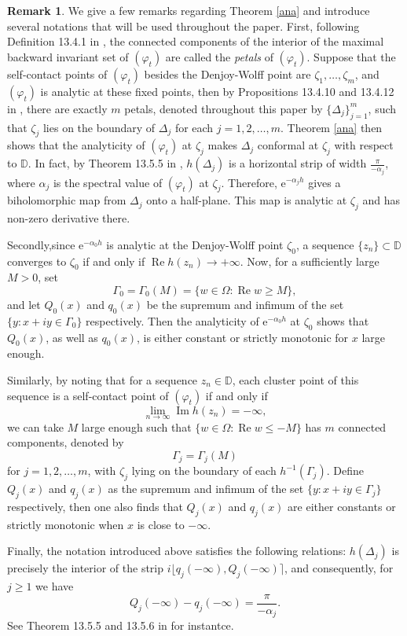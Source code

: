 \documentclass{amsart}
\theoremstyle{proclaim}
\theoremstyle{fancyproclaim}
\theoremstyle{definition}
\newtheorem{remark}[theorem]{Remark}
\theoremstyle{fancystatement}
\numberwithin{equation}{section}
\begin{document}
\begin{remark}\label{remarkchang}
We give a few remarks regarding Theorem \ref{ana} and introduce several notations that will be used throughout the paper. First, following Definition 13.4.1 in \cite{cs}, the connected components of the interior of the maximal backward invariant set of $(\varphi_t)$ are called the  \emph{petals} of $(\varphi_t)$. Suppose that the self-contact points of $(\varphi_t)$ besides the Denjoy-Wolff point are $\zeta_1,\dots,\zeta_m$, and $(\varphi_t)$ is analytic at these fixed points, then by Propositions 13.4.10 and 13.4.12 in \cite{cs}, there are exactly $m$ petals, denoted throughout this paper by $\{\Delta_j\}_{j=1}^m$, such that $\zeta_j$ lies on the boundary of $\Delta_j$ for each $j = 1,2,\dots,m$.  Theorem  \ref{ana} then shows that the analyticity of $(\varphi_t)$ at $\zeta_j$ makes $\Delta_j$ conformal at $\zeta_j$ with respect to $\mathbb{D}$. In fact, by Theorem 13.5.5 in \cite{cs}, $h(\Delta_j)$ is a horizontal strip of width $\frac{\pi}{-\alpha_j}$, where $\alpha_j$ is the spectral value of $(\varphi_t)$ at $\zeta_j$. Therefore, $\mathrm{e}^{-\alpha_j h}$ gives a biholomorphic map from $\Delta_j$ onto a half-plane. This map is analytic at $\zeta_j$ and has non-zero derivative there.


Secondly,since $\mathrm{e}^{-\alpha_0 h}$ is analytic at the Denjoy-Wolff point $\zeta_0$, a sequence $\{z_n\}\subset\mathbb{D}$ converges to $\zeta_0$ if and only if $\operatorname{Re}h(z_n)\to+\infty$.  Now, for a sufficiently large $M>0$, set 
$$\Gamma_0=\Gamma_0(M)=\{w\in\Omega : \operatorname{Re}w\geq M\},$$  
and let $Q_0(x)$ and $q_0(x)$ be the supremum and infimum of the set $\{y : x+iy\in \Gamma_0\}$ respectively. Then the analyticity of $\mathrm{e}^{-\alpha_0h}$ at $\zeta_0$ shows that $Q_0(x)$, as well as $q_0(x)$, is either constant or strictly monotonic for $x$ large enough. 

Similarly, by noting that for a sequence $z_n\in\mathbb{D}$, each cluster point of this sequence is a self-contact point of $(\varphi_t)$ if and only if
$$\lim_{n\to\infty}\operatorname{Im}h(z_n)=-\infty,$$
we can take $M$ large enough such that $\{w\in\Omega : \operatorname{Re}w\leq -M\}$ has $m$ connected components, denoted by 
$$\Gamma_j=\Gamma_j(M)$$
for $j=1, 2, \dots, m$, with $\zeta_j$ lying on the boundary of each $h^{-1}(\Gamma_j)$. Define $Q_j(x)$ and $q_j(x)$ as the supremum and infimum of the set $\{y : x+iy\in \Gamma_j\}$ respectively, then one also finds that $Q_j(x)$ and $q_j(x)$ are either constants or strictly monotonic when $x$ is close to $-\infty$.  

Finally, the notation introduced above satisfies the following relations: $h(\Delta_j)$ is precisely the interior of the strip $i\lfloor q_j(-\infty),Q_j(-\infty)\rceil$, and consequently, for $j\geq 1$ we have $$Q_j(-\infty)-q_j(-\infty)=\frac{\pi}{-\alpha_j}.$$
See Theorem 13.5.5 and 13.5.6 in \cite{cs} for instantce.
\end{remark}
\end{document}
